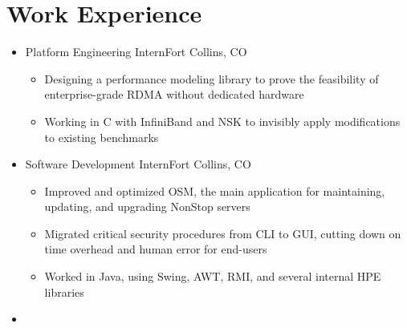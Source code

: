 \documentclass[10pt,letterpaper,sans]{moderncv}
\renewcommand{\_}{\textscale{.7}{\textunderscore}}
\newcommand{\Rplus}{\protect\hspace{-.1em}\protect\raisebox{.35ex}{\smaller{\smaller\textbf{+}}}}
\newcommand{\Cpp}{\mbox{C\Rplus\Rplus}\xspace}
\begin{document}
\section{Work Experience}
\begin{itemize}
\item{
  {Platform Engineering Intern}{Fort Collins, CO}{}{
    \begin{itemize}
    \item Designing a performance modeling library to prove the feasibility of enterprise-grade RDMA without dedicated hardware
    \item Working in \Cpp with InfiniBand and NSK to invisibly apply modifications to existing benchmarks
    \end{itemize}
}}
\item{
  {Software Development Intern}{Fort Collins, CO}{}{
    \begin{itemize}
    \item Improved and optimized OSM, the main application for maintaining, updating,
      and upgrading NonStop servers
    \item Migrated critical security procedures from CLI to GUI, cutting down on time
      overhead and human error for end-users
    \item Worked in Java, using Swing, AWT, RMI, and several internal HPE libraries
    \end{itemize}
}}
\item{}
\end{itemize}
\end{document}
